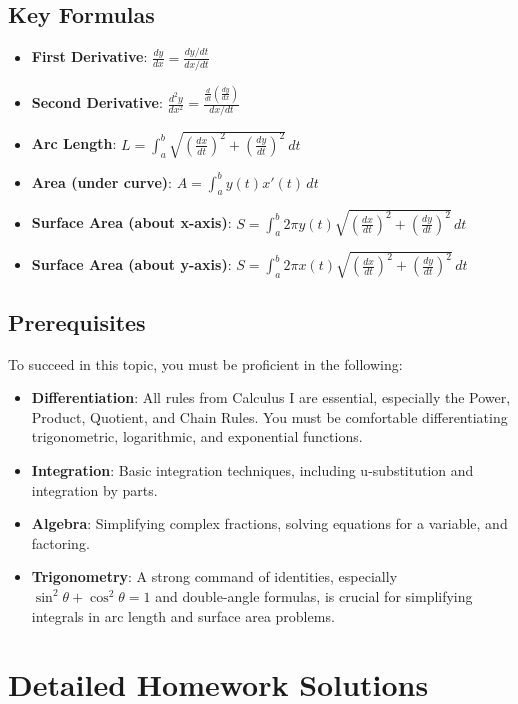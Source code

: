 \documentclass{article}
\begin{document}
\subsection{Key Formulas}
\begin{itemize}
    \item \textbf{First Derivative}: $\displaystyle \frac{dy}{dx} = \frac{dy/dt}{dx/dt}$
    \item \textbf{Second Derivative}: $\displaystyle \frac{d^2y}{dx^2} = \frac{\frac{d}{dt}\left(\frac{dy}{dx}\right)}{dx/dt}$
    \item \textbf{Arc Length}: $\displaystyle L = \int_{a}^{b} \sqrt{\left(\frac{dx}{dt}\right)^2 + \left(\frac{dy}{dt}\right)^2} \, dt$
    \item \textbf{Area (under curve)}: $\displaystyle A = \int_{a}^{b} y(t) x'(t) \, dt$
    \item \textbf{Surface Area (about x-axis)}: $\displaystyle S = \int_{a}^{b} 2\pi y(t) \sqrt{\left(\frac{dx}{dt}\right)^2 + \left(\frac{dy}{dt}\right)^2} \, dt$
    \item \textbf{Surface Area (about y-axis)}: $\displaystyle S = \int_{a}^{b} 2\pi x(t) \sqrt{\left(\frac{dx}{dt}\right)^2 + \left(\frac{dy}{dt}\right)^2} \, dt$
\end{itemize}

\subsection{Prerequisites}
To succeed in this topic, you must be proficient in the following:
\begin{itemize}
    \item \textbf{Differentiation}: All rules from Calculus I are essential, especially the Power, Product, Quotient, and Chain Rules. You must be comfortable differentiating trigonometric, logarithmic, and exponential functions.
    \item \textbf{Integration}: Basic integration techniques, including u-substitution and integration by parts.
    \item \textbf{Algebra}: Simplifying complex fractions, solving equations for a variable, and factoring.
    \item \textbf{Trigonometry}: A strong command of identities, especially $\sin^2\theta + \cos^2\theta = 1$ and double-angle formulas, is crucial for simplifying integrals in arc length and surface area problems.
\end{itemize}

\newpage
\section{Detailed Homework Solutions}
\end{document}
